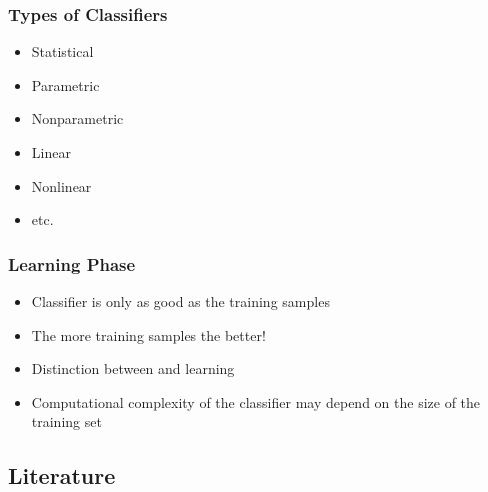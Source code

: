 \begin{frame}
   \frametitle{Types of Classifiers}


   \begin{itemize}
      \item Statistical
      \item Parametric
      \item Nonparametric
      \item Linear
      \item Nonlinear
      \item etc.
   \end{itemize}
\end{frame}


\begin{frame}
   \frametitle{Learning Phase}

   \begin{itemize}
      \item Classifier is only as good as the training samples
      \item The more training samples the better! \\[.5cm]
      \item Distinction between  and  learning\\[.5cm]
      \item Computational complexity of the classifier may depend on the size of the training set
   \end{itemize}
\end{frame}




\ifnosummary
   \subsection{Literature}


